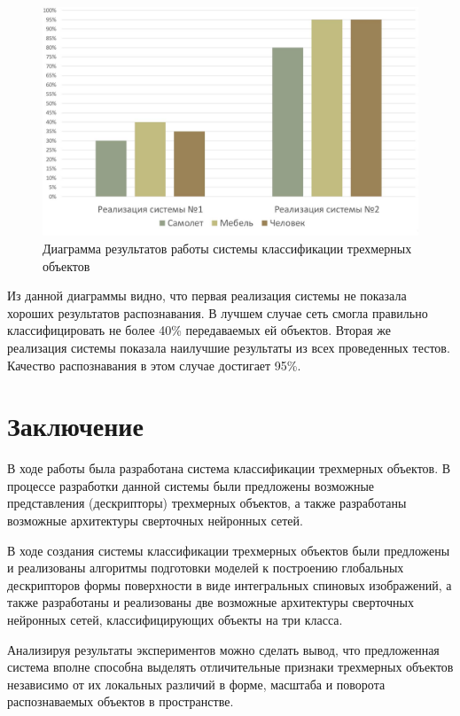 \documentclass[14pt]{article}
\numberwithin{figure}{section}
\numberwithin{equation}{section}
\begin{document}
\begin{figure}[h]
   \begin{center}
       \includegraphics[scale=0.3] {13.JPG}
       \caption{Диаграмма результатов работы системы классификации трехмерных объектов}
       \label{ris:13}
   \end{center}
\end{figure}

Из данной диаграммы видно, что первая реализация системы не показала хороших результатов распознавания. В лучшем случае сеть смогла правильно классифицировать не более 40\% передаваемых ей объектов. Вторая же реализация системы показала наилучшие результаты из всех проведенных тестов. Качество распознавания в этом случае достигает 95\%.

\newpage
{}
\section*{Заключение}

В ходе работы была разработана система классификации трехмерных объектов. В процессе разработки данной системы были предложены возможные представления (дескрипторы) трехмерных объектов, а также разработаны возможные архитектуры сверточных нейронных сетей.

В ходе создания системы классификации трехмерных объектов были предложены и реализованы алгоритмы подготовки моделей к построению глобальных дескрипторов формы поверхности в виде интегральных спиновых изображений, а также разработаны и реализованы две возможные архитектуры сверточных нейронных сетей, классифицирующих объекты на три класса.

Анализируя результаты экспериментов можно сделать вывод, что предложенная система вполне способна выделять отличительные признаки трехмерных объектов независимо от их локальных различий в форме, масштаба и поворота распознаваемых объектов в пространстве.
\end{document}
